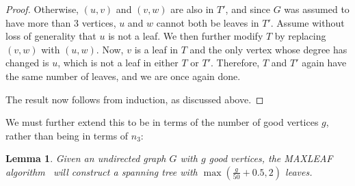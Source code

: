 \documentclass[letterpaper,twoside]{article}
\newtheorem{lemma}{Lemma}
\newcommand{\maxleaf}{\textrm{M{\scriptsize AX}\-L{\scriptsize EAF}}}
\begin{document}
\begin{proof}
    Otherwise, $(u,v)$ and $(v,w)$ are also in $T'$, and since $G$
    was assumed to have more than 3 vertices, $u$ and $w$ cannot
    both be leaves in $T'$. Assume without loss of generality that
    $u$ is not a leaf. We then further modify $T$ by replacing $(v,w)$ with
    $(u,w)$. Now, $v$ is a leaf in $T$ and the only vertex whose
    degree has changed is $u$, which is not a leaf in either $T$ or
    $T'$. Therefore, $T$ and $T'$ again have the same number of
    leaves, and we are once again done.

    The result now follows from induction, as discussed above.
\end{proof}

We must further extend this to be in terms of the number of good
vertices $g$, rather than being in terms of $n_3$:
\begin{lemma} \label{lem:leaves}
  Given an undirected graph $G$ with $g$ good vertices, the
  \maxleaf{} algorithm~\cite{LR98} will construct a spanning tree
  with $\max(\frac{g}{50} + 0.5, 2)$ leaves.
\end{lemma}
\end{document}
